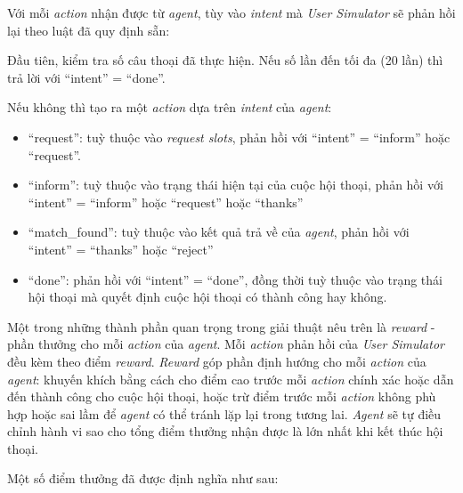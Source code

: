 Với mỗi \textit{action} nhận được từ \textit{agent}, tùy vào
\textit{intent} mà \textit{User Simulator} sẽ phản hồi lại
theo luật đã quy định sẵn:

Đầu tiên, kiểm tra số câu thoại đã thực hiện. Nếu số lần
đến tối đa (20 lần) thì trả lời với \enquote{intent} = \enquote{done}.

Nếu không thì tạo ra một \textit{action} dựa trên \textit{intent}
của \textit{agent}:

\begin{itemize}
    \item \enquote{request}: tuỳ thuộc vào \textit{request slots},
    phản hồi với \enquote{intent} = \enquote{inform} hoặc \enquote{request}.
    \item \enquote{inform}: tuỳ thuộc vào trạng thái hiện tại của
    cuộc hội thoại, phản hồi với \enquote{intent} = \enquote{inform}
    hoặc \enquote{request} hoặc \enquote{thanks}
    \item \enquote{match\_found}: tuỳ thuộc vào kết quả trả về của
    \textit{agent}, phản hồi với \enquote{intent} = \enquote{thanks}
    hoặc \enquote{reject}
    \item \enquote{done}: phản hồi với \enquote{intent} = \enquote{done},
    đồng thời tuỳ thuộc vào trạng thái hội thoại mà quyết định
    cuộc hội thoại có thành công hay không.
\end{itemize}

Một trong những thành phần quan trọng trong giải thuật nêu trên là
\textit{reward} - phần thưởng cho mỗi \textit{action} của \textit{agent}.
Mỗi \textit{action} phản hồi của \textit{User Simulator} đều kèm theo
điểm \textit{reward}. \textit{Reward} góp phần định hướng cho mỗi
\textit{action} của \textit{agent}: khuyến khích bằng cách cho điểm cao
trước mỗi \textit{action} chính xác hoặc dẫn đến thành công cho
cuộc hội thoại, hoặc trừ điểm trước mỗi \textit{action} không phù hợp
hoặc sai lầm để \textit{agent} có thể tránh lặp lại trong tương lai.
\textit{Agent} sẽ tự điều chỉnh hành vi sao cho tổng điểm thưởng
nhận được là lớn nhất khi kết thúc hội thoại.

Một số điểm thưởng đã được định nghĩa như sau:

